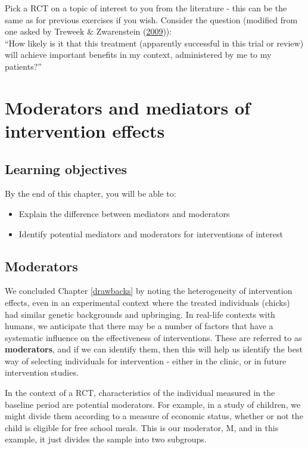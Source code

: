 \documentclass{krantz}
\begin{document}
Pick a RCT on a topic of interest to you from the literature - this can be the same as for previous exercises if you wish. Consider the question (modified from one asked by Treweek \& Zwarenstein (\protect\hyperlink{ref-treweek2009}{2009})):\\
``How likely is it that this treatment (apparently successful in this trial or review) will achieve important benefits in my context, administered by me to my patients?''

\hypertarget{mediators}{%
\chapter{Moderators and mediators of intervention effects}\label{mediators}}

\hypertarget{learning-objectives-14}{%
\section{Learning objectives}\label{learning-objectives-14}}

By the end of this chapter, you will be able to:

\begin{itemize}
\item
  Explain the difference between mediators and moderators
\item
  Identify potential mediators and moderators for interventions of interest
\end{itemize}

\hypertarget{moderators}{%
\section{Moderators}\label{moderators}}

We concluded Chapter \ref{drawbacks} by noting the heterogeneity of intervention effects, even in an experimental context where the treated individuals (chicks) had similar genetic backgrounds and upbringing. In real-life contexts with humans, we anticipate that there may be a number of factors that have a systematic influence on the effectiveness of interventions. These are referred to as \textbf{moderators}, and if we can identify them, then this will help us identify the best way of selecting individuals for intervention - either in the clinic, or in future intervention studies.

In the context of a RCT, characteristics of the individual measured in the baseline period are potential moderators. For example, in a study of children, we might divide them according to a measure of economic status, whether or not the child is eligible for free school meals. This is our moderator, M, and in this example, it just divides the sample into two subgroups.
\end{document}
